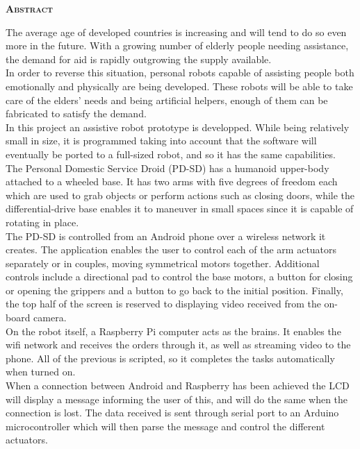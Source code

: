 
\vspace*{2cm}
\begin{center}
\color{part} \textsc{\huge \textbf{Abstract}}\\[1cm]
\end{center}

The average age of developed countries is increasing and will tend to do so even more in the future. With a growing number of elderly people needing assistance, the demand for aid is rapidly outgrowing the supply available.\\

In order to reverse this situation, personal robots capable of assisting people both emotionally and physically are being developed. These robots will be able to take care of the elders' needs and being artificial helpers, enough of them can be fabricated to satisfy the demand.\\

In this project an assistive robot prototype is developped. While being relatively small in size, it is programmed taking into account that the software will eventually be ported to a full-sized robot, and so it has the same capabilities.\\

The Personal Domestic Service Droid (PD-SD) has a humanoid upper-body attached to a wheeled base. It has two arms with five degrees of freedom each which are used to grab objects or perform actions such as closing doors, while the differential-drive base enables it to maneuver in small spaces since it is capable of rotating in place.\\

The PD-SD is controlled from an Android phone over a wireless network it creates. The application enables the user to control each of the arm actuators separately or in couples, moving symmetrical motors together. Additional controls include a directional pad to control the base motors, a button for closing or opening the grippers and a button to go back to the initial position. Finally, the top half of the screen is reserved to displaying video received from the on-board camera.\\

On the robot itself, a Raspberry Pi computer acts as the brains. It enables the wifi network and receives the orders through it, as well as streaming video to the phone. All of the previous is scripted, so it completes the tasks automatically when turned on.\\

When a connection between Android and Raspberry has been achieved the LCD will display a message informing the user of this, and will do the same when the connection is lost. The data received is sent through serial port to an Arduino microcontroller which will then parse the message and control the different actuators. 